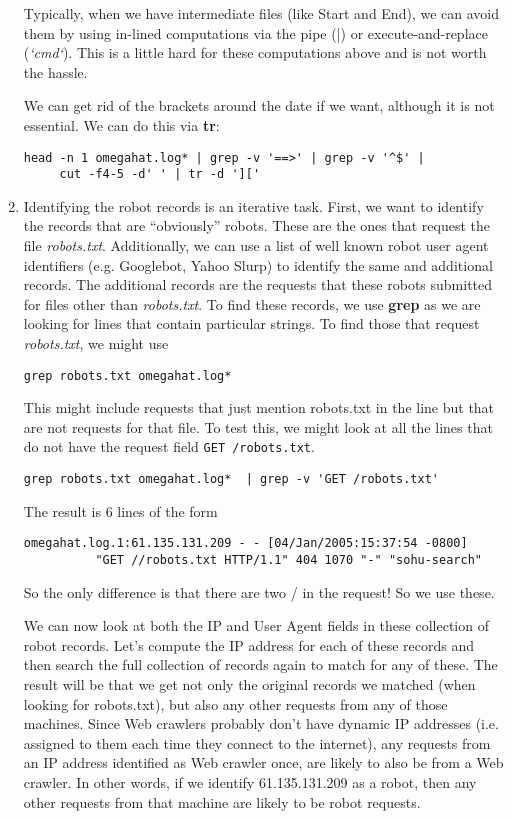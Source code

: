 \documentclass[10pt]{article}
\def\executable#1{\textbf{#1}}
\begin{document}
\begin{enumerate}
Typically, when we have intermediate files (like Start and End),
we can avoid them by using in-lined computations via 
the pipe (|) or execute-and-replace (\textit{`cmd`}).
This is a little hard for these computations above
and is not worth the hassle.

We can get rid of the brackets around the date if we want,
although it is not essential.
We can do this via \executable{tr}:
\begin{verbatim}
head -n 1 omegahat.log* | grep -v '==>' | grep -v '^$' |
     cut -f4-5 -d' ' | tr -d ']['
\end{verbatim}


\item
Identifying the robot records is an iterative task.
First, we want to identify the records that are ``obviously''
robots.  These are the ones that request the file
\textsl{robots.txt}.
Additionally,  we can use a list of well known robot
user agent identifiers (e.g. Googlebot, Yahoo Slurp)
to identify the same and additional  records.
The additional records are the requests that these robots
submitted for files other than \textsl{robots.txt}.
To find these records, we use \executable{grep}
as we are looking for lines that contain particular strings.
To find those that request \textsl{robots.txt}, we might use
\begin{verbatim}
grep robots.txt omegahat.log*
\end{verbatim}
This might include requests that just mention robots.txt in the line
but that are not requests for that file.
To test this, we might look at all the lines that do not have
the request field \texttt{GET /robots.txt}.
\begin{verbatim}
grep robots.txt omegahat.log*  | grep -v 'GET /robots.txt'
\end{verbatim}
The result is 6 lines of
the form
\begin{verbatim}
omegahat.log.1:61.135.131.209 - - [04/Jan/2005:15:37:54 -0800] 
          "GET //robots.txt HTTP/1.1" 404 1070 "-" "sohu-search"
\end{verbatim}
So the only difference is that there are two / in the request!
So we use these.

We can now look at both the IP and User Agent fields in these collection of robot records.
Let's compute the IP address for each of these records and then search the 
full collection of records again to match for any of these.
The result will be that we get
not only the original records we matched (when looking for robots.txt),
but also any other requests from any of those machines.  Since Web crawlers
probably don't  have dynamic IP addresses (i.e. assigned to them each time they connect to the
internet), any requests from an IP address identified as Web  crawler once, are likely
to also be from a Web crawler.
In other words, 
if we identify 61.135.131.209 as a robot, then 
any other requests from that machine are likely to be robot requests.


\end{enumerate}
\end{document}

